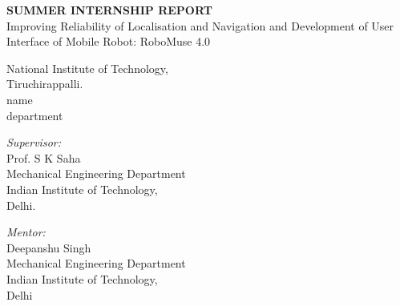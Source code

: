 \documentclass[12pt]{article}
\begin{document}
\thispagestyle{empty}
\begin{center}


\vspace*{2.2cm} 
{\LARGE \textbf{\centering SUMMER INTERNSHIP REPORT}} 
\vspace{1.0cm} \\
{\LARGE Improving Reliability of Localisation and Navigation and Development of User Interface of Mobile Robot: RoboMuse 4.0\\}

\vspace{1.0cm}

\begin{minipage}{0.6\textwidth}
\begin{center}    \large
National Institute of Technology,\\
Tiruchirappalli.\\
name \\
department\\


\end{center}
\end{minipage}
\vspace{0.5cm}

\begin{minipage}{0.6\textwidth}
\begin{center}    \large
\emph{Supervisor:}\\
Prof. S K Saha\\ %
Mechanical Engineering Department\\
Indian Institute of Technology,\\
Delhi.
\end{center}
\end{minipage}
\vspace{0.5cm}

\begin{minipage}{0.6\textwidth}
\begin{center} \large
\vspace{.2 cm}
\emph{Mentor:}\\
  Deepanshu Singh\\
  Mechanical Engineering Department\\
  Indian Institute of Technology,\\
  Delhi\\
\end{center}
\end{minipage}


\end{center}
\end{document}

